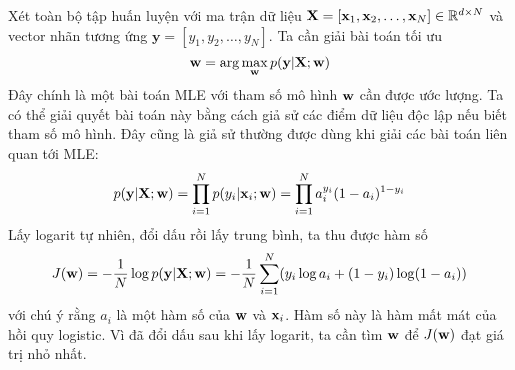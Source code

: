 Xét toàn bộ tập huấn luyện với ma trận dữ liệu $\mathbf{X} =
[\mathbf{x}_1,\mathbf{x}_2, \dots, \mathbf{x}_N] \in \mathbb{R}^{d \times N}$ và
vector nhãn tương ứng $\mathbf{y} = [y_1, y_2, \dots, y_N]$. Ta
cần giải bài toán tối ưu%
\begin{equation}
\label{eqn:10_1_7}
\mathbf{w} = \arg\max_{\mathbf{w}} p(\mathbf{y}|\mathbf{X}; \mathbf{w})
\end{equation}
Đây chính là một bài toán MLE với tham số mô hình
$\mathbf{w}$ cần được ước lượng. Ta có thể giải quyết bài toán này bằng cách giả sử các điểm dữ liệu độc lập nếu biết tham số mô hình. Đây cũng là giả sử thường được dùng khi giải các bài toán liên quan tới MLE:
\begin{equation}
p(\mathbf{y}|\mathbf{X}; \mathbf{w}) = \prod_{i=1}^N p(y_i| \mathbf{x}_i; \mathbf{w})
= \prod_{i=1}^N a_i^{y_i}(1 - a_i)^{1- y_i}
\end{equation}
Lấy logarit tự nhiên, đổi dấu rồi lấy trung bình, ta thu được hàm số
\begin{equation}
J(\mathbf{w}) = -\frac{1}{N}\log p(\mathbf{y}|\mathbf{X}; \mathbf{w})
= -\frac{1}{N}\sum_{i=1}^N(y_i \log a_i + (1-y_i) \log (1 - a_i))
\end{equation}
với chú ý rằng $a_i$ là một hàm số của $\mathbf{w}$ và $\mathbf{x}_i$. Hàm số này là hàm mất
mát của hồi quy logistic. Vì đã đổi dấu sau khi lấy logarit, ta cần tìm $\mathbf{w}$ để
$J(\mathbf{w})$ đạt giá trị nhỏ nhất.


